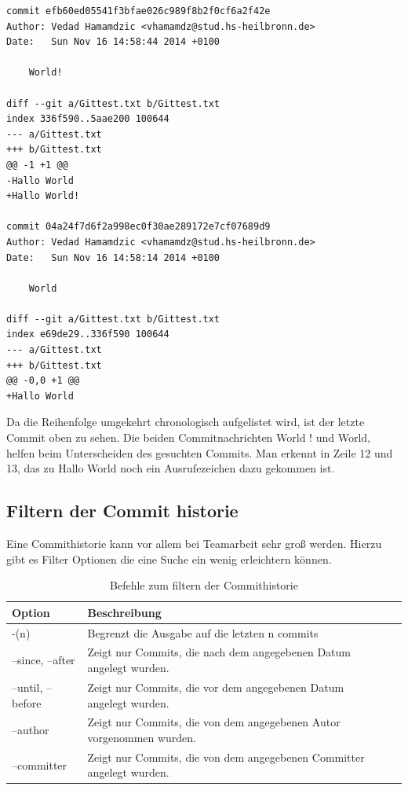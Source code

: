 \documentclass[12pt,a4paper,bibliography=totocnumbered,listof=totocnumbered]{scrartcl}
\begin{document}
\vspace{1em}
\begin{lstlisting}[caption=Git log Unterschiede der letzten 2 Commits, label=lst:arduino]
commit efb60ed05541f3bfae026c989f8b2f0cf6a2f42e
Author: Vedad Hamamdzic <vhamamdz@stud.hs-heilbronn.de>
Date:   Sun Nov 16 14:58:44 2014 +0100

    World!

diff --git a/Gittest.txt b/Gittest.txt
index 336f590..5aae200 100644
--- a/Gittest.txt
+++ b/Gittest.txt
@@ -1 +1 @@
-Hallo World
+Hallo World!

commit 04a24f7d6f2a998ec0f30ae289172e7cf07689d9
Author: Vedad Hamamdzic <vhamamdz@stud.hs-heilbronn.de>
Date:   Sun Nov 16 14:58:14 2014 +0100

    World

diff --git a/Gittest.txt b/Gittest.txt
index e69de29..336f590 100644
--- a/Gittest.txt
+++ b/Gittest.txt
@@ -0,0 +1 @@
+Hallo World
\end{lstlisting}
Da die Reihenfolge umgekehrt chronologisch aufgelistet wird, ist der letzte Commit oben zu sehen. Die beiden Commitnachrichten World ! und World, helfen beim Unterscheiden des gesuchten Commits. Man erkennt in Zeile 12 und 13, das zu Hallo World noch ein Ausrufezeichen dazu gekommen ist.
\newpage


\subsection{Filtern der Commit historie}
Eine Commithistorie kann vor allem bei Teamarbeit sehr groß werden. Hierzu gibt es Filter Optionen die eine Suche ein wenig erleichtern können. 
 \vspace{1em}
\begin{table}[!h]
	\centering
	\begin{tabular}{|l|l|l|}
		\hline
		\textbf{Option} & \textbf{Beschreibung} \\
		\hline
		-(n)& Begrenzt die Ausgabe auf die letzten n commits\\
		\hline
		--since, --after & Zeigt nur Commits, die nach dem angegebenen Datum angelegt wurden.\\
		\hline
		--until, --before & Zeigt nur Commits, die vor dem angegebenen Datum angelegt wurden.\\
		\hline
		--author & Zeigt nur Commits, die von dem angegebenen Autor vorgenommen wurden.\\
		\hline
		--committer & Zeigt nur Commits, die von dem angegebenen Committer angelegt wurden.\\
		\hline
	\end{tabular}
	\caption{Befehle zum filtern der Commithistorie}
	\label{tab:Befehle}
\end{table}
\end{document}
